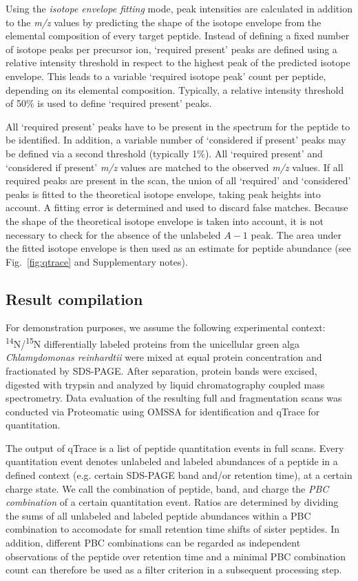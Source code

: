 Using the {\em isotope envelope fitting} mode, peak intensities are calculated in 
addition to the {\em m/z} values by predicting the shape of the 
isotope envelope from the elemental composition of every target peptide. 
Instead of defining a fixed number of isotope peaks per precursor ion, `required
present' peaks are defined using a relative intensity threshold in respect to the
highest peak of the predicted isotope envelope.
This leads to a variable `required isotope peak' count per peptide, depending on 
its elemental composition.
Typically, a relative intensity threshold of 50\% is used to define `required 
present' peaks. 

All `required present' peaks have to be present in the spectrum for the peptide 
to be identified.
In addition, a variable number of `considered if present' peaks may be defined
via a second threshold (typically 1\%). 
All `required present' and `considered if present' {\em m/z} values are matched 
to the observed {\em m/z} values.
If all required peaks are present in the scan, the union of all `required' and
`considered' peaks is fitted to the theoretical isotope envelope, taking peak
heights into account.
A fitting error is determined and used to discard false matches.
Because the shape of the theoretical isotope envelope is taken into account, 
it is not necessary to check for the absence of the unlabeled $A-1$ peak.
The area under the fitted isotope envelope is then used as an estimate for
peptide abundance (see Fig.~\ref{fig:qtrace} and Supplementary notes).

\subsection{Result compilation}

For demonstration purposes, we assume the following experimental context:
\textsuperscript{14}N/\textsuperscript{15}N differentially labeled proteins from 
the unicellular green alga {\em Chlamydomonas reinhardtii} were mixed at equal 
protein concentration and fractionated by SDS-PAGE. After separation, protein 
bands were excised, digested with trypsin and analyzed by liquid chromatography 
coupled mass spectrometry.
Data evaluation of the resulting full and fragmentation scans was conducted via 
Proteomatic using OMSSA for identification and qTrace for quantitation. 

The output of qTrace is a list of peptide quantitation events in full scans.
Every quantitation event denotes unlabeled and labeled abundances of a peptide 
in a defined context (e.g. certain SDS-PAGE band and/or retention time),
at a certain charge state.
We call the combination of peptide, band, and charge the {\em PBC combination}
of a certain quantitation event.
Ratios are determined by dividing the sums of all unlabeled and labeled peptide
abundances within a PBC combination to accomodate for small retention time
shifts of sister peptides.
In addition, different PBC combinations can be regarded as independent observations 
of the peptide over retention time and a minimal PBC combination count can therefore 
be used as a filter criterion in a subsequent processing step.

